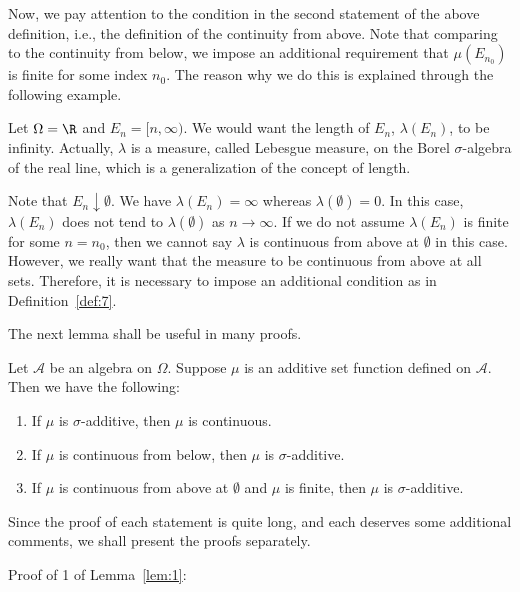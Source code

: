 \documentclass[thmcnt=section, 12pt, color=purple]{my-elegantbook}
\begin{document}
Now, we pay attention to the condition in the second statement
of the above definition, i.e., 
the definition of the continuity from above.
Note that comparing to the continuity from below, 
we impose an additional requirement that $\mu(E_{n_0})$ is finite
for some index $n_0$.
The reason why we do this is explained through the following example.

\begin{example} \label{eg:3}
	Let $\Omega = \R$ and $E_n = [n, \infty)$.
	We would want the length of $E_n$, $\lambda(E_n)$,
	to be infinity.
	Actually, $\lambda$ is a measure, called Lebesgue measure, 
	on the Borel $\sigma$-algebra of the real line,
	which is a generalization of the concept of length.

	Note that $E_n \downarrow \emptyset$.
	We have $\lambda(E_n) = \infty$ whereas $\lambda(\emptyset) = 0$.
	In this case, $\lambda(E_n)$ does not tend to $\lambda(\emptyset)$
	as $n \to \infty$.
	If we do not assume $\lambda(E_n)$ is finite for some $n = n_0$,
	then we cannot say $\lambda$ is continuous from above at $\emptyset$
	in this case.
	However, we really want that the measure to be continuous from above
	at all sets.
	Therefore, it is necessary to impose an additional condition
	as in Definition~\ref{def:7}.
\end{example}


The next lemma shall be useful in many proofs.

\begin{lemma} \label{lem:1}
	Let $\mathcal{A}$ be an algebra on $\Omega$.
	Suppose $\mu$ is an additive set function defined on $\mathcal{A}$.
	Then we have the following:
	\begin{enumerate}
		\item If $\mu$ is $\sigma$-additive, 
			then $\mu$ is continuous.
		\item If $\mu$ is continuous from below,
			then $\mu$ is $\sigma$-additive.
		\item If $\mu$ is continuous from above at $\emptyset$
			and $\mu$ is finite,
			then $\mu$ is $\sigma$-additive.
	\end{enumerate}
\end{lemma}

Since the proof of each statement is
quite long, and each deserves some additional comments,
we shall present the proofs separately.

Proof of 1 of Lemma~\ref{lem:1}:
\end{document}
